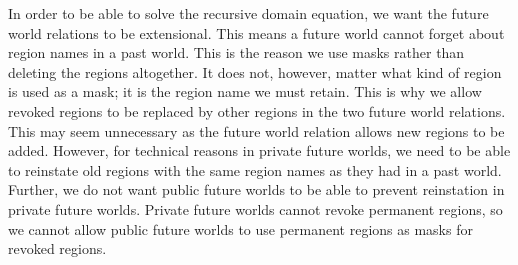 \documentclass[format=acmsmall, review=true, screen=true]{acmart}
\newcommand{\plainview}[1]{\mathrm{#1}}
\newcommand{\temp}{\plainview{temp}}
\newcommand{\revoked}{\plainview{revoked}}
\newenvironment{toplas}%
    {\color{OliveGreen}}{}
\begin{document}
\begin{toplas}
  In order to be able to solve the recursive domain equation, we want the future world relations to be extensional.
  This means a future world cannot forget about region names in a past world.
  This is the reason we use masks rather than deleting the regions altogether.
  It does not, however, matter what kind of region is used as a mask; it is the region name we must retain.
  This is why we allow revoked regions to be replaced by other regions in the two future world relations.
  This may seem unnecessary as the future world relation allows new regions to be added. However, for technical reasons in private future worlds, we need to be able to reinstate old regions with the same region names as they had in a past world.
  Further, we do not want public future worlds to be able to prevent reinstation in private future worlds.
  Private future worlds cannot revoke permanent regions, so we cannot allow public future worlds to use permanent regions as masks for revoked regions.
\end{toplas}




\end{document}
